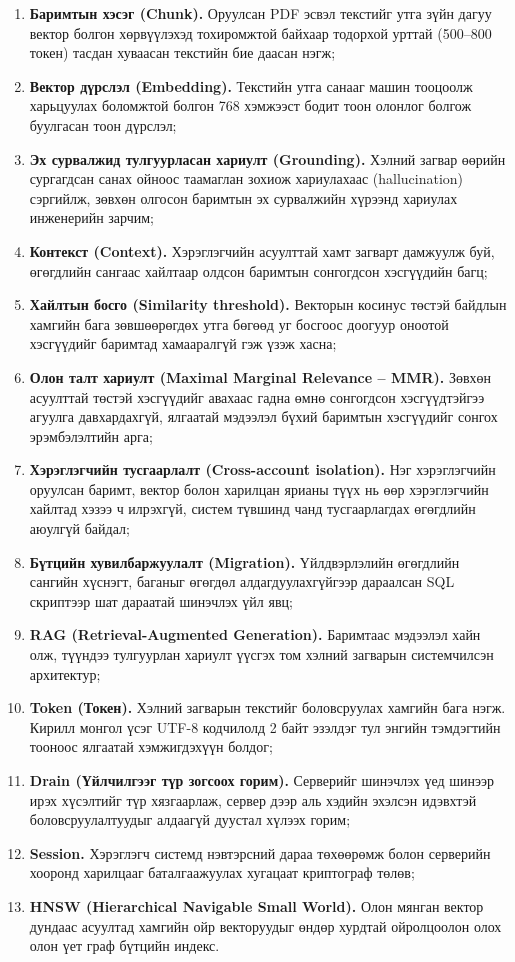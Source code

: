 \documentclass[../main.tex]{subfiles}
\begin{document}
\begin{enumerate}
\setlength{\itemsep}{1.5pt plus 1pt minus 1pt}
\setlength{\parsep}{0pt}
\setlength{\parskip}{0pt}
\item \textbf{Баримтын хэсэг (Chunk).} Оруулсан PDF эсвэл текстийг утга зүйн
дагуу вектор болгон хөрвүүлэхэд тохиромжтой байхаар тодорхой урттай
(500--800 токен) тасдан хуваасан текстийн бие даасан нэгж;
\item \textbf{Вектор дүрслэл (Embedding).} Текстийн утга санааг машин
тооцоолж харьцуулах боломжтой болгон 768 хэмжээст бодит тоон олонлог болгож
буулгасан тоон дүрслэл;
\item \textbf{Эх сурвалжид тулгуурласан хариулт (Grounding).} Хэлний загвар
өөрийн сургагдсан санах ойноос таамаглан зохиож хариулахаас (hallucination)
сэргийлж, зөвхөн олгосон баримтын эх сурвалжийн хүрээнд хариулах инженерийн
зарчим;
\item \textbf{Контекст (Context).} Хэрэглэгчийн асуулттай хамт загварт
дамжуулж буй, өгөгдлийн сангаас хайлтаар олдсон баримтын сонгогдсон
хэсгүүдийн багц;
\item \textbf{Хайлтын босго (Similarity threshold).} Векторын косинус
төстэй байдлын хамгийн бага зөвшөөрөгдөх утга бөгөөд уг босгоос доогуур
оноотой хэсгүүдийг баримтад хамааралгүй гэж үзэж хасна;
\item \textbf{Олон талт хариулт (Maximal Marginal Relevance -- MMR).}
Зөвхөн асуулттай төстэй хэсгүүдийг авахаас гадна өмнө сонгогдсон хэсгүүдтэйгээ
агуулга давхардахгүй, ялгаатай мэдээлэл бүхий баримтын хэсгүүдийг сонгох
эрэмбэлэлтийн арга;
\item \textbf{Хэрэглэгчийн тусгаарлалт (Cross-account isolation).} Нэг
хэрэглэгчийн оруулсан баримт, вектор болон харилцан ярианы түүх нь өөр
хэрэглэгчийн хайлтад хэзээ ч илрэхгүй, систем түвшинд чанд тусгаарлагдах
өгөгдлийн аюулгүй байдал;
\item \textbf{Бүтцийн хувилбаржуулалт (Migration).} Үйлдвэрлэлийн өгөгдлийн
сангийн хүснэгт, баганыг өгөгдөл алдагдуулахгүйгээр дараалсан SQL скриптээр
шат дараатай шинэчлэх үйл явц;
\item \textbf{RAG (Retrieval-Augmented Generation).} Баримтаас мэдээлэл
хайн олж, түүндээ тулгуурлан хариулт үүсгэх том хэлний загварын системчилсэн
архитектур;
\item \textbf{Token (Токен).} Хэлний загварын текстийг боловсруулах
хамгийн бага нэгж. Кирилл монгол үсэг UTF-8 кодчилолд 2 байт эзэлдэг тул
энгийн тэмдэгтийн тооноос ялгаатай хэмжигдэхүүн болдог;
\item \textbf{Drain (Үйлчилгээг түр зогсоох горим).} Серверийг шинэчлэх үед
шинээр ирэх хүсэлтийг түр хязгаарлаж, сервер дээр аль хэдийн эхэлсэн идэвхтэй
боловсруулалтуудыг алдаагүй дуустал хүлээх горим;
\item \textbf{Session.} Хэрэглэгч системд нэвтэрсний дараа төхөөрөмж болон
серверийн хооронд харилцааг баталгаажуулах хугацаат криптограф төлөв;
\item \textbf{HNSW (Hierarchical Navigable Small World).} Олон мянган
вектор дундаас асуултад хамгийн ойр векторуудыг өндөр хурдтай ойролцоолон
олох олон үет граф бүтцийн индекс.
\end{enumerate}
\end{document}
